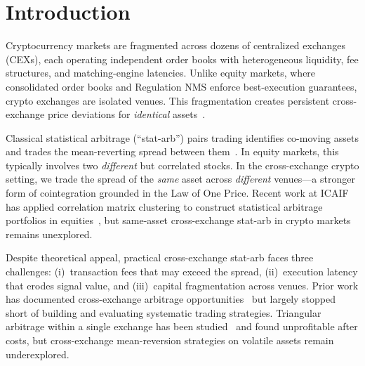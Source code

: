 \documentclass[sigconf,nonacm=false]{acmart}
\begin{document}


\maketitle

\section{Introduction}\label{sec:intro}

Cryptocurrency markets are fragmented across dozens of centralized exchanges (CEXs), each operating independent order books with heterogeneous liquidity, fee structures, and matching-engine latencies. Unlike equity markets, where consolidated order books and Regulation NMS enforce best-execution guarantees, crypto exchanges are isolated venues. This fragmentation creates persistent cross-exchange price deviations for \emph{identical} assets~\cite{makarov2020trading}.

Classical statistical arbitrage (``stat-arb'') pairs trading identifies co-moving assets and trades the mean-reverting spread between them~\cite{krauss2017statistical}. In equity markets, this typically involves two \emph{different} but correlated stocks. In the cross-exchange crypto setting, we trade the spread of the \emph{same} asset across \emph{different} venues---a stronger form of cointegration grounded in the Law of One Price. Recent work at ICAIF has applied correlation matrix clustering to construct statistical arbitrage portfolios in equities~\cite{jin2023correlation}, but same-asset cross-exchange stat-arb in crypto markets remains unexplored.

Despite theoretical appeal, practical cross-exchange stat-arb faces three challenges: (i)~transaction fees that may exceed the spread, (ii)~execution latency that erodes signal value, and (iii)~capital fragmentation across venues. Prior work has documented cross-exchange arbitrage opportunities~\cite{makarov2020trading, gandal2021key} but largely stopped short of building and evaluating systematic trading strategies. Triangular arbitrage within a single exchange has been studied~\cite{fischler2024wish} and found unprofitable after costs, but cross-exchange mean-reversion strategies on volatile assets remain underexplored.
\end{document}
